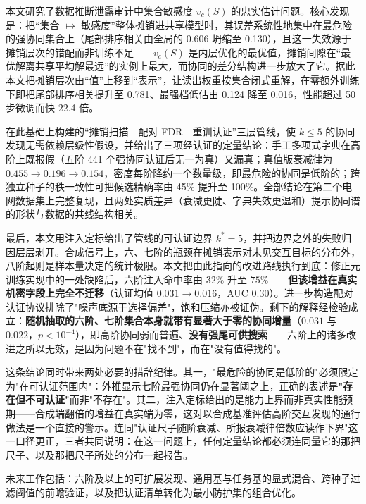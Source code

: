 \documentclass[10.5pt,compsoc,UTF8]{CjC}
\theoremstyle{mystyle}
\begin{document}
本文研究了数据推断泄露审计中集合敏感度 $v_c(S)$ 的忠实估计问题。核心发现是：把“集合 $\mapsto$ 敏感度”整体摊销进共享模型时，其误差系统性地集中在最危险的强协同集合上（尾部排序相关由全局的 0.606 坍缩至 0.130），且这一失效源于摊销层次的错配而非训练不足——$v_c(S)$ 是内层优化的最优值，摊销间隙在“最优解离共享平均解最远”的实例上最大，而协同的差分结构进一步放大了它。据此本文把摊销层次由“值”上移到“表示”，让读出权重按集合闭式重解，在零额外训练下即把尾部排序相关提升至 0.781、最强档低估由 0.124 降至 0.016，性能超过 50 步微调而快 22.4 倍。

在此基础上构建的“摊销扫描—配对 FDR—重训认证”三层管线，使 $k\le5$ 的协同发现无需依赖层级性假设，并给出了三项经认证的定量结论：手工多项式字典在高阶上既报假（五阶 441 个强协同认证后无一为真）又漏真；真值版衰减律为 $0.455\to0.196\to0.154$，密度每阶降约一个数量级，即最危险的协同是低阶的；跨独立种子的秩一致性可把候选精确率由 45\% 提升至 100\%。全部结论在第二个电网数据集上完整复现，且两处实质差异（衰减更陡、字典失效更温和）提示协同谱的形状与数据的共线结构相关。

最后，本文用注入定标给出了管线的可认证边界 $k^\ast=5$，并把边界之外的失败归因层层剥开。合成信号上，六、七阶的瓶颈在摊销表示对未见交互目标的分布外，八阶起则是样本量决定的统计极限。本文把由此指向的改进路线执行到底：修正元训练实现中的一处缺陷后，六阶注入命中率由 $32\%$ 升至 $75\%$——\textbf{但该增益在真实机密字段上完全不迁移}（认证均值 $0.031\to0.016$，AUC $0.30$）。进一步构造配对认证协议排除了"噪声底源于选择偏差"，饱和压缩亦被证伪。剩下的解释经检验成立：\textbf{随机抽取的六阶、七阶集合本身就带有显著大于零的协同增量}（$0.031$ 与 $0.022$，$p<10^{-4}$），即高阶协同弱而普遍、\textbf{没有强尾可供搜索}——六阶上的诸多改进之所以无效，是因为问题不在"找不到"，而在"没有值得找的"。

这条结论同时带来两处必要的措辞纪律。其一，"最危险的协同是低阶的"必须限定为"在可认证范围内"：外推显示七阶最强协同仍在显著阈之上，正确的表述是\textbf{"存在但不可认证"}而非"不存在"。其二，注入定标给出的是能力上界而非真实性能预期——合成端翻倍的增益在真实端为零，这对以合成基准评估高阶交互发现的通行做法是一个直接的警示。连同"认证尺子随阶衰减、所报衰减律倍数应读作下界"这一口径更正，三者共同说明：在这一问题上，任何定量结论都必须连同量它的那把尺子、以及那把尺子所处的分布一起报告。

未来工作包括：六阶及以上的可扩展发现、通用基与任务基的显式混合、跨种子过滤阈值的前瞻验证，以及把认证清单转化为最小防护集的组合优化。

\vskip 5mm
\vspace{2mm}


\end{document}
